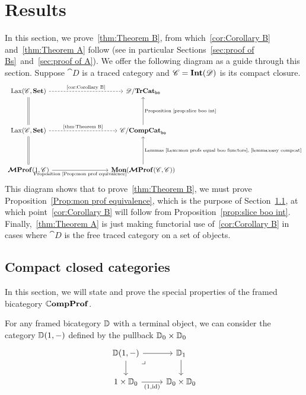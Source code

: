 \documentclass[12pt,oneside,article,draft]{memoir}
\begin{document}
\chapter{Results}\label{sec:generalization}

In this section, we prove~\ref{thm:Theorem B}, from which~\ref{cor:Corollary B} and~\ref{thm:Theorem A} follow (see in particular Sections~\ref{sec:proof of Bs}~and~\ref{sec:proof of A}).
We offer the following diagram as a guide through this section.
Suppose $\cat{D}$ is a traced category and $\mathscr{C}=\mathbf{Int}(\mathscr{D})$ is its compact closure.
\[
\begin{tikzcd}[column sep=3cm,row sep=1.5cm]
	\Lax(\cat{C},\Set)\ar[r,dashed,"\tn{\ref{cor:Corollary B}}"]\ar[d,equal] & \cat{D}/\TrCat_{\bo} \\
	\Lax(\cat{C},\Set)\ar[r,dashed,"\tn{\ref{thm:Theorem B}}"]\ar[d,equal] & \cat{C}/\CompCat_{\bo}\ar[u,"\tn{Proposition~\ref{prop:slice boo int}}"'] \\
	\MProf(1,\cat{C})\ar[r,"\tn{Proposition~\ref{Prop:mon prof equivalence}}"'] & \Mon(\MProf(\cat{C},\cat{C}))\ar[u,"\tn{Lemmas~\ref{Lem:mon profs equal boo functors},\ \ref{lemma:easy compcat}}"']
\end{tikzcd}
\]
This diagram shows that to prove~\ref{thm:Theorem B}, we must prove Proposition~\ref{Prop:mon prof equivalence}, which is the purpose of Section~\ref{sec:ccc's}, at which point~\ref{cor:Corollary B} will follow from Proposition~\ref{prop:slice boo int}.
Finally,~\ref{thm:Theorem A} is just making functorial use of~\ref{cor:Corollary B} in cases where $\cat{D}$ is the free traced category on a set of objects.


\section{Compact closed categories}\label{sec:ccc's}

In this section, we will state and prove the special properties of the framed bicategory $\mathbb{C}\mathbf{ompProf}$.

For any framed bicategory $\mathbb{D}$ with a terminal object, we can consider the category $\mathbb{D}(1,-)$ defined by the pullback $\mathbb{D}_0\times\mathbb{D}_0$
\begin{equation}
	\begin{tikzcd}
		\dcat{D}(1,-) \ar[r] \ar[d] \arrow[dr,phantom,"\lrcorner",very near start]
			& \dcat{D}_1 \ar[d] \\
		1\times\dcat{D}_0 \ar[r,"{(1,\id)}"']
			& \dcat{D}_0\times\dcat{D}_0
	\end{tikzcd}
\end{equation}
\end{document}
